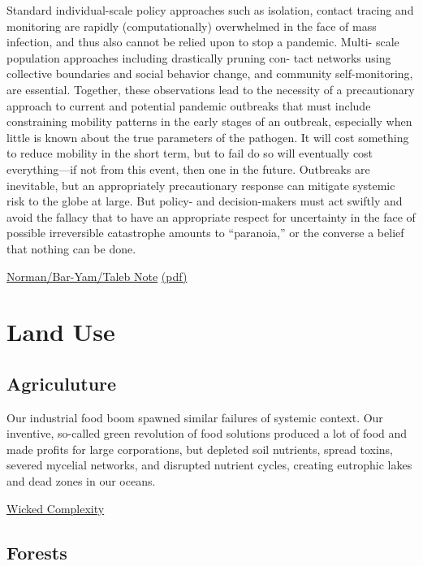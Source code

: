 \documentclass[
]{book}
\begin{document}
Standard individual-scale policy approaches
such as isolation, contact tracing and monitoring are rapidly
(computationally) overwhelmed in the face of mass infection,
and thus also cannot be relied upon to stop a pandemic. Multi-
scale population approaches including drastically pruning con-
tact networks using collective boundaries and social behavior
change, and community self-monitoring, are essential.
Together, these observations lead to the necessity of a
precautionary approach to current and potential pandemic
outbreaks that must include constraining mobility patterns in
the early stages of an outbreak, especially when little is known
about the true parameters of the pathogen.
It will cost something to reduce mobility in the short term,
but to fail do so will eventually cost everything---if not from
this event, then one in the future. Outbreaks are inevitable, but
an appropriately precautionary response can mitigate systemic
risk to the globe at large. But policy- and decision-makers must
act swiftly and avoid the fallacy that to have an appropriate
respect for uncertainty in the face of possible irreversible
catastrophe amounts to ``paranoia,'' or the converse a belief
that nothing can be done.

\href{https://necsi.edu/systemic-risk-of-pandemic-via-novel-pathogens-coronavirus-a-note}{Norman/Bar-Yam/Taleb Note}
\href{/pdf/Joseph_Norman_2020_Systemic_Risk_of_Pandemic_via_Novel_Pathogenes.pdf}{(pdf)}

\hypertarget{land-use}{%
\chapter{Land Use}\label{land-use}}

\hypertarget{agriculuture}{%
\section{Agriculuture}\label{agriculuture}}

Our industrial food boom spawned similar failures of systemic context. Our inventive, so-called green revolution of food solutions produced a lot of food and made profits for large corporations, but depleted soil nutrients, spread toxins, severed mycelial networks, and disrupted nutrient cycles, creating eutrophic lakes and dead zones in our oceans.

\href{https://mahb.stanford.edu/blog/thresholds-cascades-and-wicked-problems/}{Wicked Complexity}

\hypertarget{forests}{%
\section{Forests}\label{forests}}
\end{document}
